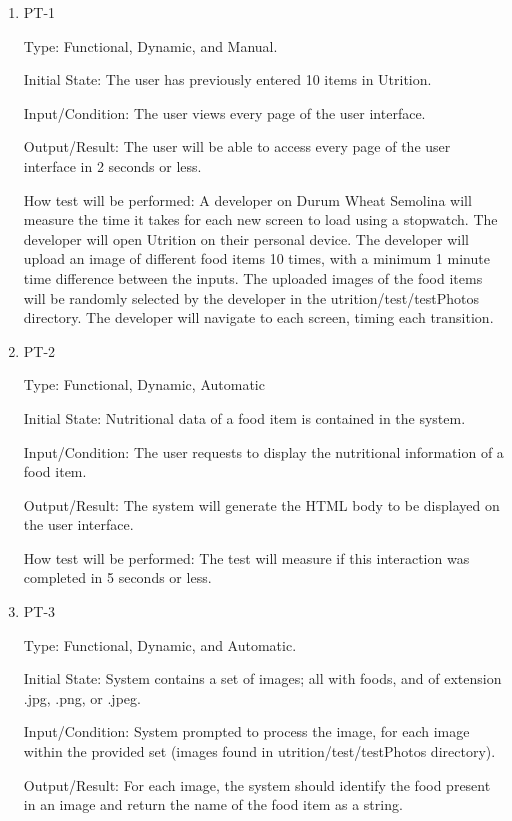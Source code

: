 \documentclass[12pt, titlepage]{article}
\begin{document}
	\begin{enumerate}
		
		\item{PT-1} 
		
		Type: Functional, Dynamic, and Manual.
		
		Initial State: The user has previously entered 10 items in Utrition.
		
		Input/Condition: The user views every page of the user interface.
		
		Output/Result: The user will be able to access every page of the user interface in 2 seconds or less.
		
		How test will be performed: A developer on Durum Wheat Semolina will measure the time it takes for each new screen to load using a stopwatch. The developer will open Utrition on their personal device. The developer will upload an image of different food items 10 times, with a minimum 1 minute time difference between the inputs. The uploaded images of the food items will be randomly selected by the developer in the utrition/test/testPhotos directory. The developer will navigate to each screen, timing each transition.
		
		\item{PT-2}
		
		Type: Functional, Dynamic, Automatic
		
		Initial State: Nutritional data of a food item is contained in the 
		system.
		
		Input/Condition: The user requests to display the nutritional information of a 
		food item.
		
		Output/Result: The system will generate the HTML body to be displayed on 
		the user 
		interface.
		
		How test will be performed: The test will measure if this interaction 
		was completed in 5 seconds or less.
		
		\item{PT-3}
		
		Type: Functional, Dynamic, and Automatic.
		
		Initial State: System contains a set of images; all with foods, and of 
		extension .jpg, .png, or .jpeg.
		
		Input/Condition: System prompted to process the image, for each image 
		within the provided set (images found in utrition/test/testPhotos directory).
		
		Output/Result: For each image, the system should identify the food 
		present in an image and return the name of the food item as a string.
		

\end{enumerate}
\end{document}
